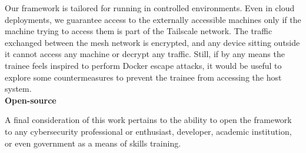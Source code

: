 Our framework is tailored for running in controlled environments. Even in cloud deployments, we guarantee access to the externally accessible machines only if the machine trying to access them is part of the Tailscale network. The traffic exchanged between the mesh network is encrypted, and any device sitting outside it cannot access any machine or decrypt any traffic. Still, if by any means the trainee feels inspired to perform Docker escape attacks, it would be useful to explore some countermeasures to prevent the trainee from accessing the host system.\\

\textbf{Open-source}

A final consideration of this work pertains to the ability to open the framework to any cybersecurity professional or enthusiast, developer, academic institution, or even government as a means of skills training.
